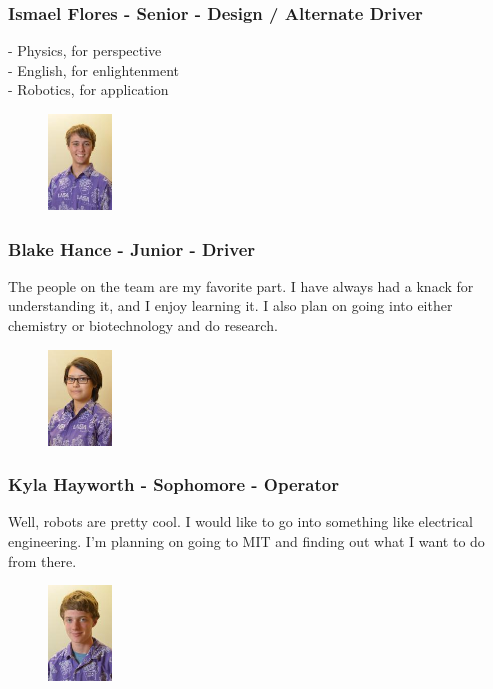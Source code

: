 \subsubsection{Ismael Flores - Senior - Design / Alternate Driver} 
- Physics, for perspective\\
- English, for enlightenment\\
- Robotics, for application

\begin{figure}
	\centering
	\includegraphics[height=1in]{blake}
\end{figure}
\subsubsection{Blake Hance - Junior - Driver} 
The people on the team are my favorite part.  I have always had a knack for understanding it, and I enjoy learning it. I also plan on going into either chemistry or biotechnology and do research.

\begin{figure}
	\centering
	\includegraphics[height=1in]{kyla}
\end{figure}
\subsubsection{Kyla Hayworth - Sophomore - Operator} 
Well, robots are pretty cool. I would like to go into something like electrical engineering.  I'm planning on going to MIT and finding out what I want to do from there. \\

\begin{figure}
	\centering
	\includegraphics[height=1in]{jackson}
\end{figure}
